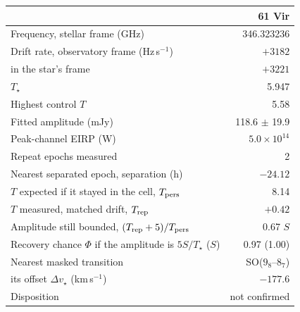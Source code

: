 \begin{tabular}{@{}>{\raggedright\arraybackslash}p{}@{~~}r@{}}
\hline
 & 61 Vir \\
\hline
Frequency, stellar frame (GHz) & 346.323236 \\
Drift rate, observatory frame (Hz\,s$^{-1}$) & $+3182$ \\
\quad in the star\textquoteright s frame & $+3221$ \\
$T_\star$ & 5.947 \\
Highest control $T$ & 5.58 \\
Fitted amplitude (mJy) & 118.6 $\pm$ 19.9 \\
Peak-channel EIRP (W) & $5.0 \times 10^{14}$ \\
Repeat epochs measured & 2 \\
Nearest separated epoch, separation (h) & $-24.12$ \\
$T$ expected if it stayed in the cell, $T_{\rm pers}$ & 8.14 \\
$T$ measured, matched drift, $T_{\rm rep}$ & $+0.42$ \\
Amplitude still bounded, $(T_{\rm rep}+5)/T_{\rm pers}$ & 0.67 $S$ \\
Recovery chance $\Phi$ if the amplitude is $5S/T_\star$ ($S$) & 0.97 (1.00) \\
Nearest masked transition & SO($9_{8}$--$8_{7}$) \\
\quad its offset $\Delta v_\star$ (km\,s$^{-1}$) & $-177.6$ \\
Disposition & not confirmed \\
\hline
\end{tabular}
